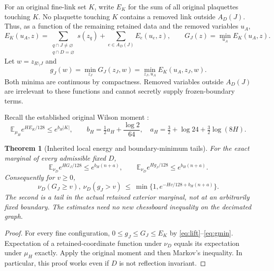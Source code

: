 \documentclass[11pt]{article}
\newtheorem{theorem}{Theorem}[section]
\theoremstyle{definition}
\theoremstyle{remark}
\newcommand{\E}{\mathbb E}
\begin{document}
For an original fine-link set $K$, write $E_K$ for the sum of all
original plaquettes touching $K$. No plaquette touching $K$ contains a
removed link outside $A_D(J)$. Thus, as a function of the remaining
retained data and the removed variables $u_A$,
\begin{equation}
 E_K(u_A,z)=
 \sum_{\substack{q\cap J\ne\varnothing\\q\cap D=\varnothing}}s(z_q)
       +\sum_{e\in A_D(J)} E_e(u_e,z),\qquad
 G_J(z)=\min_{u_A}E_K(u_A,z).
 \label{eq:lift}
\end{equation}
Let $w=z_{R\setminus J}$ and
\begin{equation}
 g_J(w)=\min_{z_J}G_J(z_J,w)
       =\min_{z_J,u_A}E_K(u_A,z_J,w).
 \label{eq:gmin}
\end{equation}
Both minima are continuous by compactness. Removed variables outside
$A_D(J)$ are irrelevant to these functions and cannot secretly supply
frozen-boundary terms.

Recall the established original Wilson moment \cite{boundary}:
\[
 \E_{\mu_H}e^{HE_K/128}\le e^{b_H|K|},\qquad
 b_H=\tfrac12a_H+\frac{\log2}{64},\quad
 a_H=\tfrac32+\log24+\tfrac32\log(8H).
\]
\begin{theorem}[Inherited local energy and boundary-minimum tails]
\label{thm:moment}
For the exact marginal of every admissible fixed $D$,
\begin{equation}
 \E_{\nu_D}e^{HG_J/128}\le e^{b_H(n+a)},\qquad
 \E_{\nu_D}e^{Hg_J/128}\le e^{b_H(n+a)}.
 \label{eq:moment}
\end{equation}
Consequently for $v\ge0$,
\begin{equation}
 \nu_D(G_J\ge v),\ \nu_D(g_J>v)
 \ \le\ \min\{1,e^{-Hv/128+b_H(n+a)}\}.
 \label{eq:tails}
\end{equation}
The second is a tail in the \emph{actual retained exterior marginal},
not at an arbitrarily fixed boundary. The estimates need no new
chessboard inequality on the decimated graph.
\end{theorem}
\begin{proof}
For every fine configuration, $0\le g_J\le G_J\le E_K$ by
\eqref{eq:lift}--\eqref{eq:gmin}. Expectation of a retained-coordinate
function under $\nu_D$ equals its expectation under $\mu_H$ exactly.
Apply the original moment and then Markov's inequality. In particular,
this proof works even if $D$ is not reflection invariant.
\end{proof}
\end{document}
